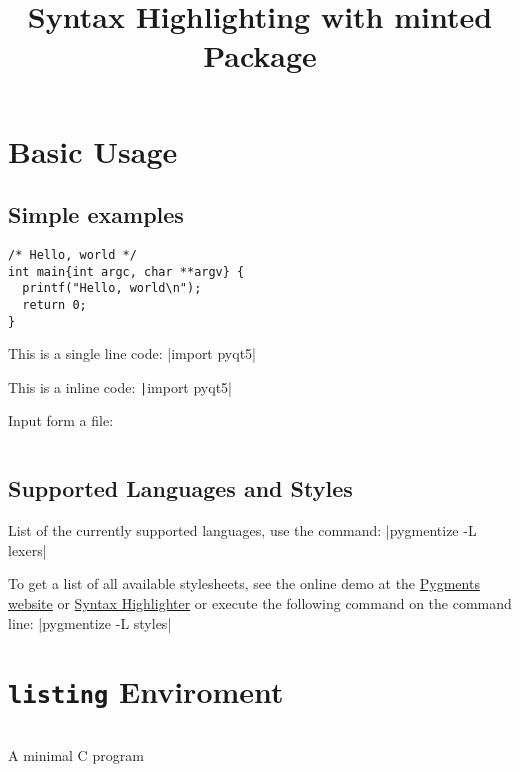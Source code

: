 \documentclass{article}
\begin{document}
\title{Syntax Highlighting with minted Package}

\maketitle

\tableofcontents

\listoflistings   %

\section{Basic Usage}

\subsection{Simple examples}

\begin{verbatim}
/* Hello, world */
int main{int argc, char **argv} {
  printf("Hello, world\n");
  return 0;
}
\end{verbatim}

This is a single line code: |import pyqt5|

This is a inline code: \texttt|import pyqt5|

Input form a file:

\inputminted[]{c}{../code/helloworld.c}

\subsection{Supported Languages and Styles}

List of the currently supported languages, use the command: |pygmentize -L lexers|

To get a list of all available stylesheets, see the online demo at the 
\href{https://pygments.org/demo/}{Pygments website} or 
\href{https://thepythonguru.com/tools/pygments-demo/}{Syntax Highlighter}
or execute the following command on the command line: |pygmentize -L styles|

\cprotect\section{\verb|listing| Enviroment}

\begin{listing}[H]
  \inputminted[]{c}{../code/helloworld.c}
  \caption{A minimal C program}
  \label{lst:helloworld}
\end{listing}
\end{document}
